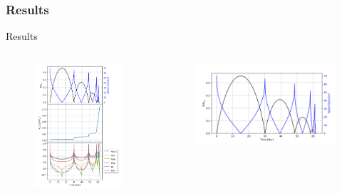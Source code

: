 \documentclass{beamer}
\begin{document}
\subsubsection{Results}
\begin{frame}{Results}
	\begin{columns}
		\begin{column}{0.3\linewidth}
			\begin{figure}[h]
				\centering
				\includegraphics[height=0.7\textheight]{"../Files/Week 6/properties_s02v70"}
			\end{figure}
		\end{column}
		\begin{column}{0.7\linewidth}
			\begin{figure}[h]
				\centering
				\includegraphics[width = \linewidth]{"../Files/Week 6/properties_s02v70_1"}

\end{figure}
\end{column}
\end{columns}
\end{frame}
\end{document}
